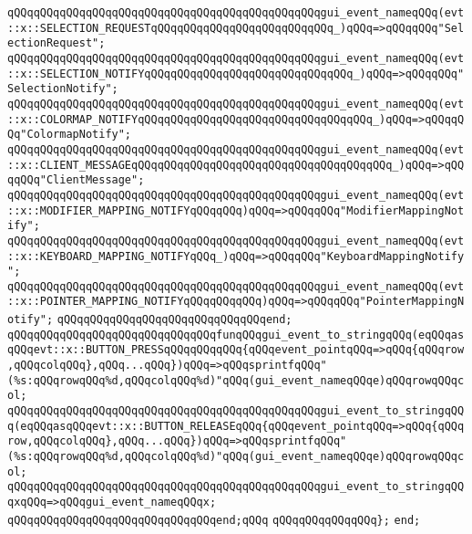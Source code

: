 \verb|qQQqqQQqqQQqqQQqqQQqqQQqqQQqqQQqqQQqqQQqqQQqqQQqgui_event_nameqQQq(evt::x::SELECTION_REQUESTqQQqqQQqqQQqqQQqqQQqqQQqqQQq_)qQQq=>qQQqqQQq"SelectionRequest";|\newline
\verb|qQQqqQQqqQQqqQQqqQQqqQQqqQQqqQQqqQQqqQQqqQQqqQQqgui_event_nameqQQq(evt::x::SELECTION_NOTIFYqQQqqQQqqQQqqQQqqQQqqQQqqQQqqQQq_)qQQq=>qQQqqQQq"SelectionNotify";|\newline
\verb|qQQqqQQqqQQqqQQqqQQqqQQqqQQqqQQqqQQqqQQqqQQqqQQqgui_event_nameqQQq(evt::x::COLORMAP_NOTIFYqQQqqQQqqQQqqQQqqQQqqQQqqQQqqQQqqQQq_)qQQq=>qQQqqQQq"ColormapNotify";|\newline
\verb|qQQqqQQqqQQqqQQqqQQqqQQqqQQqqQQqqQQqqQQqqQQqqQQqgui_event_nameqQQq(evt::x::CLIENT_MESSAGEqQQqqQQqqQQqqQQqqQQqqQQqqQQqqQQqqQQqqQQq_)qQQq=>qQQqqQQq"ClientMessage";|\newline
\verb|qQQqqQQqqQQqqQQqqQQqqQQqqQQqqQQqqQQqqQQqqQQqqQQqgui_event_nameqQQq(evt::x::MODIFIER_MAPPING_NOTIFYqQQqqQQq)qQQq=>qQQqqQQq"ModifierMappingNotify";|\newline
\verb|qQQqqQQqqQQqqQQqqQQqqQQqqQQqqQQqqQQqqQQqqQQqqQQqgui_event_nameqQQq(evt::x::KEYBOARD_MAPPING_NOTIFYqQQq_)qQQq=>qQQqqQQq"KeyboardMappingNotify";|\newline
\verb|qQQqqQQqqQQqqQQqqQQqqQQqqQQqqQQqqQQqqQQqqQQqqQQqgui_event_nameqQQq(evt::x::POINTER_MAPPING_NOTIFYqQQqqQQqqQQq)qQQq=>qQQqqQQq"PointerMappingNotify";|\newline
\verb|qQQqqQQqqQQqqQQqqQQqqQQqqQQqqQQqend;|\newline
\newline
\verb|qQQqqQQqqQQqqQQqqQQqqQQqqQQqqQQqfunqQQqgui_event_to_stringqQQq(eqQQqasqQQqevt::x::BUTTON_PRESSqQQqqQQqqQQq{qQQqevent_pointqQQq=>qQQq{qQQqrow,qQQqcolqQQq},qQQq...qQQq})qQQq=>qQQqsprintfqQQq"(%s:qQQqrowqQQq%d,qQQqcolqQQq%d)"qQQq(gui_event_nameqQQqe)qQQqrowqQQqcol;|\newline
\verb|qQQqqQQqqQQqqQQqqQQqqQQqqQQqqQQqqQQqqQQqqQQqqQQqgui_event_to_stringqQQq(eqQQqasqQQqevt::x::BUTTON_RELEASEqQQq{qQQqevent_pointqQQq=>qQQq{qQQqrow,qQQqcolqQQq},qQQq...qQQq})qQQq=>qQQqsprintfqQQq"(%s:qQQqrowqQQq%d,qQQqcolqQQq%d)"qQQq(gui_event_nameqQQqe)qQQqrowqQQqcol;|\newline
\verb|qQQqqQQqqQQqqQQqqQQqqQQqqQQqqQQqqQQqqQQqqQQqqQQqgui_event_to_stringqQQqxqQQq=>qQQqgui_event_nameqQQqx;|\newline
\verb|qQQqqQQqqQQqqQQqqQQqqQQqqQQqqQQqend;qQQq|\newline
\verb|qQQqqQQqqQQqqQQq};|\newline
\verb|end;|\newline
\newline

